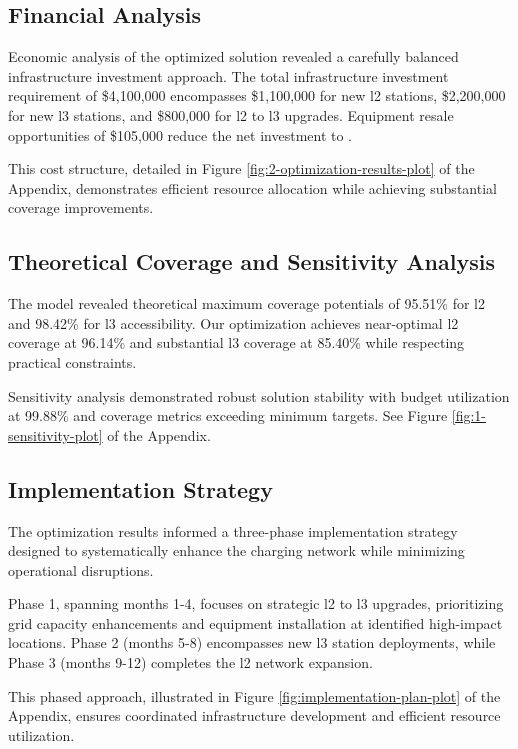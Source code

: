 \subsection*{Financial Analysis}

Economic analysis of the optimized solution revealed a carefully balanced infrastructure investment approach. The total infrastructure investment requirement of \$4,100,000 encompasses \$1,100,000 for new \gls{l2} stations, \$2,200,000 for new \gls{l3} stations, and \$800,000 for \gls{l2} to \gls{l3} upgrades. Equipment resale opportunities of \$105,000 reduce the net investment to . 

This cost structure, detailed in Figure \ref{fig:2-optimization-results-plot} of the Appendix, demonstrates efficient resource allocation while achieving substantial coverage improvements.

\subsection*{Theoretical Coverage and Sensitivity Analysis}

The model revealed theoretical maximum coverage potentials of 95.51\% for \gls{l2} and 98.42\% for \gls{l3} accessibility. Our optimization achieves near-optimal \gls{l2} coverage at 96.14\% and substantial \gls{l3} coverage at 85.40\% while respecting practical constraints. 

Sensitivity analysis demonstrated robust solution stability with budget utilization at 99.88\% and coverage metrics exceeding minimum targets. See Figure \ref{fig:1-sensitivity-plot} of the Appendix.

\subsection*{Implementation Strategy}

The optimization results informed a three-phase implementation strategy designed to systematically enhance the charging network while minimizing operational disruptions. 

Phase 1, spanning months 1-4, focuses on strategic \gls{l2} to \gls{l3} upgrades, prioritizing grid capacity enhancements and equipment installation at identified high-impact locations. Phase 2 (months 5-8) encompasses new \gls{l3} station deployments, while Phase 3 (months 9-12) completes the \gls{l2} network expansion. 

This phased approach, illustrated in Figure \ref{fig:implementation-plan-plot} of the Appendix, ensures coordinated infrastructure development and efficient resource utilization.